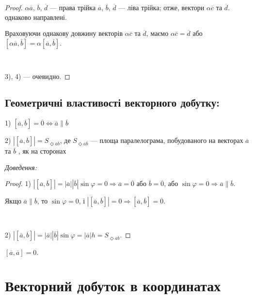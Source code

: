 \begin{proof}
	$\alpha \overline{a}$, $\overline{b}$, $\overline{d}$ --- права трійка $\overline{a}$,
	$\overline{b}$, $\overline{d}$ --- ліва трійка; отже, вектори $\alpha \overline{c}$ та $\overline{d}$.
	однаково направлені.
	
	Враховуючи однакову довжину векторів $\alpha \overline{c}$ та $\overline{d}$, маємо
	$\alpha \overline{c} = \overline{d}$ або $[\alpha \overline{a}, \overline{b}]
	= \alpha [\overline{a}, \overline{b}]$.

	~

	3), 4) --- очевидно.
\end{proof}

\subsection*{Геометричні властивості векторного добутку:}

1) $[\overline{a}, \overline{b}] = \overline{0} \Leftrightarrow \overline{a} \parallel \overline{b}$

2) $|[\overline{a}, \overline{b}]| = S_{\Diamond \overline{a}\overline{b}}$, де
$S_{\Diamond \overline{a}\overline{b}}$ --- площа паралелограма, побудованого на векторах
$\overline{a}$ та $\overline{b}$ , як на сторонах

\textit{Доведення:}

\begin{proof}
	1) $|[\overline{a},\overline{b}]| = |\overline{a}| |\overline{b}| \sin\varphi = 0
	\Rightarrow \overline{a} = \overline{0}$ або $\overline{b} = \overline{0}$, або $\sin \varphi = 0
	\Rightarrow \overline{a} \parallel \overline{b}$.
	
	Якщо $\overline{a} \parallel \overline{b}$, то $\sin \varphi = 0$, і $|[\overline{a}, \overline{b}]| = 0
	\Rightarrow [\overline{a}, \overline{b}] = \overline{0}$.
	
	~	
	
	2) $|[\overline{a},\overline{b}]| = |\overline{a}| |\overline{b}| \sin \varphi = |\overline{a}| h
	= S_{\Diamond \overline{a}\overline{b}}$.
\end{proof}

\begin{claim}
	$[\overline{a}, \overline{a}] = 0$.
\end{claim}

\section{Векторний добуток в координатах}

